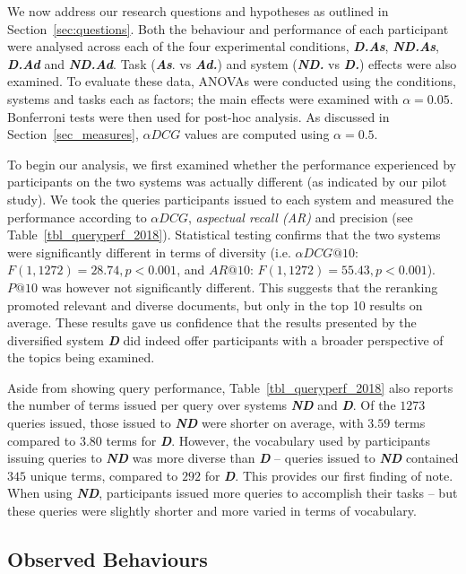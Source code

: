 We now address our research questions and hypotheses as outlined in Section~\ref{sec:questions}. Both the behaviour and performance of each participant were analysed across each of the four experimental conditions, \textbf{\emph{D.As}}, \textbf{\emph{ND.As}}, \textbf{\emph{D.Ad}} and \textbf{\emph{ND.Ad}}. Task (\emph{\textbf{As}}. vs \emph{\textbf{Ad.}}) and system (\emph{\textbf{ND.}} vs \emph{\textbf{D.}}) effects were also examined. To evaluate these data, ANOVAs were conducted using the conditions, systems and tasks each as factors; the main effects were examined with $\alpha=0.05$. Bonferroni tests were then used for post-hoc analysis. As discussed in Section~\ref{sec_measures}, $\alpha DCG$ values are computed using $\alpha=0.5$.

To begin our analysis, we first examined whether the performance experienced by participants on the two systems was actually different (as indicated by our pilot study). We took the queries participants issued to each system and measured the performance according to $\alpha DCG$, \emph{aspectual recall (AR)} and precision (see Table~\ref{tbl_queryperf_2018}). Statistical testing confirms that the two systems were significantly different in terms of diversity (i.e. $\alpha DCG@10$: $F(1, 1272)=28.74, p<0.001$, and $AR@10$: $F(1, 1272)=55.43, p<0.001$). $P@10$ was however not significantly different. This suggests that the reranking promoted relevant and diverse documents, but only in the top 10 results on average. These results gave us confidence that the results presented by the diversified system \textbf{\emph{D}} did indeed offer participants with a broader perspective of the topics being examined.
 
Aside from showing query performance, Table~\ref{tbl_queryperf_2018} also reports the number of terms issued per query over systems \textbf{\emph{ND}} and \textbf{\emph{D}}. Of the $1273$ queries issued, those issued to \textbf{\emph{ND}} were shorter on average, with $3.59$ terms compared to $3.80$ terms for \textbf{\emph{D}}. However, the vocabulary used by participants issuing queries to \textbf{\emph{ND}} was more diverse than \textbf{\emph{D}} -- queries issued to \textbf{\emph{ND}} contained $345$ unique terms, compared to $292$ for \textbf{\emph{D}}.
This provides our first finding of note. When using \textbf{\emph{ND}}, participants issued more queries to accomplish their tasks -- but these queries were slightly shorter and more varied in terms of vocabulary.

\subsection{Observed Behaviours}
